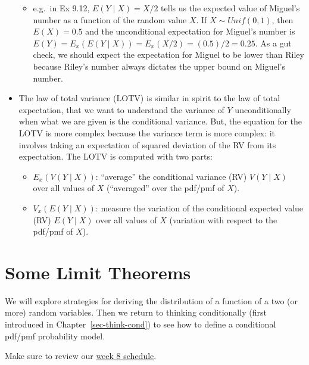 \documentclass[
  letterpaper,
]{scrbook}
\providecommand{\tightlist}{%
  \setlength{\itemsep}{0pt}\setlength{\parskip}{0pt}}\usepackage{longtable,booktabs,array}
\begin{document}
\begin{itemize}
  \begin{itemize}
  \tightlist
  \item
    e.g.~in Ex 9.12, \(E(Y \mid X) = X/2\) tells us the expected value
    of Miguel's number as a function of the random value \(X\). If
    \(X \sim Unif(0,1)\), then \(E(X) = 0.5\) and the unconditional
    expectation for Miguel's number is
    \(E(Y) = E_x(E(Y \mid X)) = E_x(X/2) = (0.5)/2 = 0.25\). As a gut
    check, we should expect the expectation for Miguel to be lower than
    Riley because Riley's number always dictates the upper bound on
    Miguel's number.
  \end{itemize}
\item
  The law of total variance (LOTV) is similar in spirit to the law of
  total expectation, that we want to understand the variance of \(Y\)
  unconditionally when what we are given is the conditional variance.
  But, the equation for the LOTV is more complex because the variance
  term is more complex: it involves taking an expectation of squared
  deviation of the RV from its expectation. The LOTV is computed with
  two parts:

  \begin{itemize}
  \tightlist
  \item
    \(E_x(V(Y \mid X))\): ``average'' the conditional variance (RV)
    \(V(Y\mid X)\) over all values of \(X\) (``averaged'' over the
    pdf/pmf of \(X\)).
  \item
    \(V_x(E(Y \mid X))\): measure the variation of the conditional
    expected value (RV) \(E(Y\mid X)\) over all values of \(X\)
    (variation with respect to the pdf/pmf of \(X\)).
  \end{itemize}
\end{itemize}


\chapter{Some Limit Theorems}\label{sec-limit-thms}

We will explore strategies for deriving the distribution of a function
of a two (or more) random variables. Then we return to thinking
conditionally (first introduced in Chapter~\ref{sec-think-cond}) to see
how to define a conditional pdf/pmf probability model.

Make sure to review our
\href{https://docs.google.com/spreadsheets/d/1RrtZ7JiEBz_r4XMC7Eib2ObRZpGSXkg2fVV1h8YrnUw/edit?usp=sharing}{week
8 schedule}.
\end{document}
